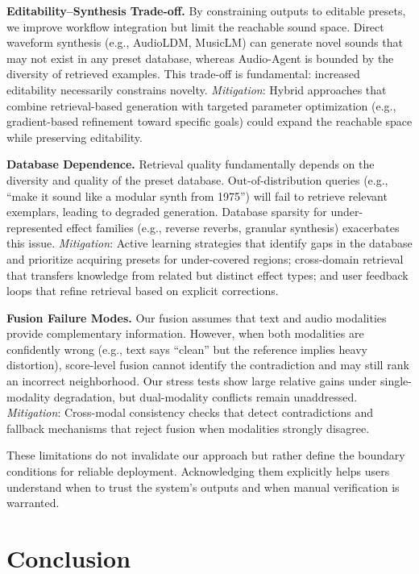 \documentclass{article}
\begin{document}
\textbf{Editability--Synthesis Trade-off.} By constraining outputs to editable presets, we improve workflow integration but limit the reachable sound space. Direct waveform synthesis (e.g., AudioLDM, MusicLM) can generate novel sounds that may not exist in any preset database, whereas Audio-Agent is bounded by the diversity of retrieved examples. This trade-off is fundamental: increased editability necessarily constrains novelty. \textit{Mitigation}: Hybrid approaches that combine retrieval-based generation with targeted parameter optimization (e.g., gradient-based refinement toward specific goals) could expand the reachable space while preserving editability.

\textbf{Database Dependence.} Retrieval quality fundamentally depends on the diversity and quality of the preset database. Out-of-distribution queries (e.g., ``make it sound like a modular synth from 1975'') will fail to retrieve relevant exemplars, leading to degraded generation. Database sparsity for under-represented effect families (e.g., reverse reverbs, granular synthesis) exacerbates this issue. \textit{Mitigation}: Active learning strategies that identify gaps in the database and prioritize acquiring presets for under-covered regions; cross-domain retrieval that transfers knowledge from related but distinct effect types; and user feedback loops that refine retrieval based on explicit corrections.

\textbf{Fusion Failure Modes.} Our fusion assumes that text and audio modalities provide complementary information. However, when both modalities are confidently wrong (e.g., text says ``clean'' but the reference implies heavy distortion), score-level fusion cannot identify the contradiction and may still rank an incorrect neighborhood. Our stress tests show large relative gains under single-modality degradation, but dual-modality conflicts remain unaddressed. \textit{Mitigation}: Cross-modal consistency checks that detect contradictions and fallback mechanisms that reject fusion when modalities strongly disagree.

These limitations do not invalidate our approach but rather define the boundary conditions for reliable deployment. Acknowledging them explicitly helps users understand when to trust the system's outputs and when manual verification is warranted.

\section{Conclusion}
\label{sec:conclusion}
\end{document}
